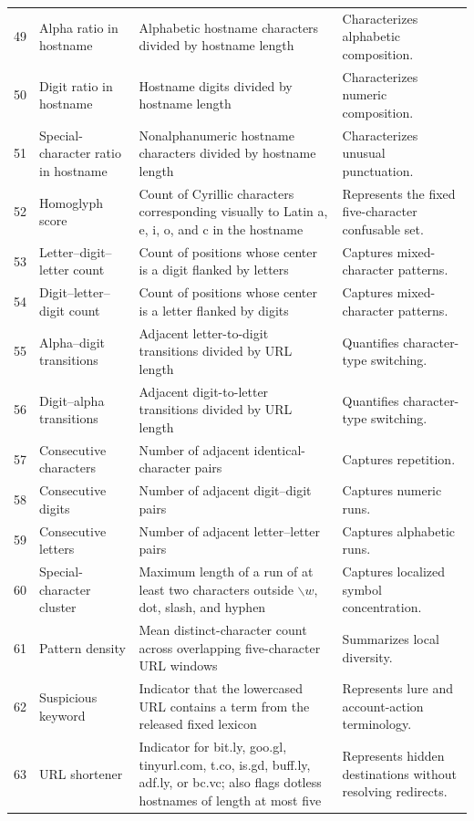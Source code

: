 \documentclass[10pt]{article}
\begin{document}
\begin{longtable}{r L{3.4cm} L{5.1cm} L{6.0cm}}
49 & Alpha ratio in hostname & Alphabetic hostname characters divided by hostname length & Characterizes alphabetic composition. \\
50 & Digit ratio in hostname & Hostname digits divided by hostname length & Characterizes numeric composition. \\
51 & Special-character ratio in hostname & Nonalphanumeric hostname characters divided by hostname length & Characterizes unusual punctuation. \\
52 & Homoglyph score & Count of Cyrillic characters corresponding visually to Latin a, e, i, o, and c in the hostname & Represents the fixed five-character confusable set. \\
53 & Letter--digit--letter count & Count of positions whose center is a digit flanked by letters & Captures mixed-character patterns. \\
54 & Digit--letter--digit count & Count of positions whose center is a letter flanked by digits & Captures mixed-character patterns. \\
55 & Alpha--digit transitions & Adjacent letter-to-digit transitions divided by URL length & Quantifies character-type switching. \\
56 & Digit--alpha transitions & Adjacent digit-to-letter transitions divided by URL length & Quantifies character-type switching. \\
57 & Consecutive characters & Number of adjacent identical-character pairs & Captures repetition. \\
58 & Consecutive digits & Number of adjacent digit--digit pairs & Captures numeric runs. \\
59 & Consecutive letters & Number of adjacent letter--letter pairs & Captures alphabetic runs. \\
60 & Special-character cluster & Maximum length of a run of at least two characters outside $\backslash w$, dot, slash, and hyphen & Captures localized symbol concentration. \\
61 & Pattern density & Mean distinct-character count across overlapping five-character URL windows & Summarizes local diversity. \\
62 & Suspicious keyword & Indicator that the lowercased URL contains a term from the released fixed lexicon & Represents lure and account-action terminology. \\
63 & URL shortener & Indicator for bit.ly, goo.gl, tinyurl.com, t.co, is.gd, buff.ly, adf.ly, or bc.vc; also flags dotless hostnames of length at most five & Represents hidden destinations without resolving redirects. \\

\end{longtable}
\end{document}
